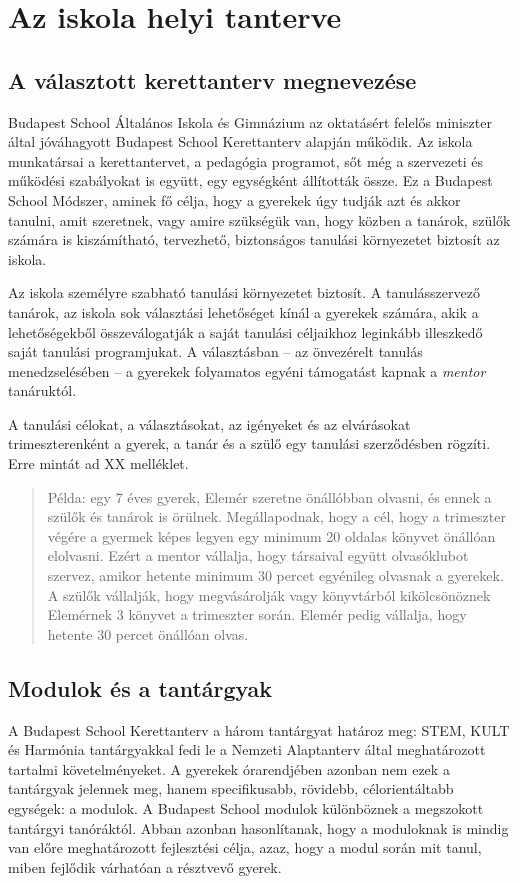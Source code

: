 \chapter{Az iskola helyi tanterve}
\label{az-iskola-helyi-tanterve}

\section{A választott kerettanterv
megnevezése}
\label{a-vuxe1lasztott-kerettanterv-megnevezuxe9se}

Budapest School Általános Iskola és Gimnázium az oktatásért felelős
miniszter által jóváhagyott Budapest School Kerettanterv alapján
működik. Az iskola munkatársai a kerettantervet, a pedagógia programot,
sőt még a szervezeti és működési szabályokat is együtt, egy egységként
állították össze. Ez a Budapest School Módszer, aminek fő célja, hogy a
gyerekek úgy tudják azt és akkor tanulni, amit szeretnek, vagy amire
szükségük van, hogy közben a tanárok, szülők számára is kiszámítható,
tervezhető, biztonságos tanulási környezetet biztosít az iskola.

Az iskola személyre szabható tanulási környezetet biztosít. A
tanulásszervező tanárok, az iskola sok választási lehetőséget kínál a
gyerekek számára, akik a lehetőségekből összeválogatják a saját tanulási
céljaikhoz leginkább illeszkedő saját tanulási programjukat. A
választásban -- az önvezérelt tanulás menedzselésében -- a gyerekek
folyamatos egyéni támogatást kapnak a \emph{mentor} tanáruktól.

A tanulási célokat, a választásokat, az igényeket és az elvárásokat
trimeszterenként a gyerek, a tanár és a szülő egy tanulási szerződésben
rögzíti. Erre mintát ad XX melléklet.

\begin{quote}
Példa: egy 7 éves gyerek, Elemér szeretne önállóbban olvasni, és ennek a
szülők és tanárok is örülnek. Megállapodnak, hogy a cél, hogy a
trimeszter végére a gyermek képes legyen egy minimum 20 oldalas könyvet
önállóan elolvasni. Ezért a mentor vállalja, hogy társaival együtt
olvasóklubot szervez, amikor hetente minimum 30 percet egyénileg
olvasnak a gyerekek. A szülők vállalják, hogy megvásárolják vagy
könyvtárból kikölcsönöznek Elemérnek 3 könyvet a trimeszter során.
Elemér pedig vállalja, hogy hetente 30 percet önállóan olvas.
\end{quote}

\section{Modulok és a tantárgyak}
A Budapest School Kerettanterv a három tantárgyat határoz meg: STEM,
KULT és Harmónia tantárgyakkal fedi le a Nemzeti Alaptanterv által
meghatározott tartalmi követelményeket. A gyerekek órarendjében azonban
nem ezek a tantárgyak jelennek meg, hanem specifikusabb, rövidebb,
célorientáltabb egységek: a modulok. A Budapest School modulok
különböznek a megszokott tantárgyi tanóráktól. Abban azonban
hasonlítanak, hogy a moduloknak is mindig van előre meghatározott
fejlesztési célja, azaz, hogy a modul során mit tanul, miben fejlődik
várhatóan a résztvevő gyerek.

